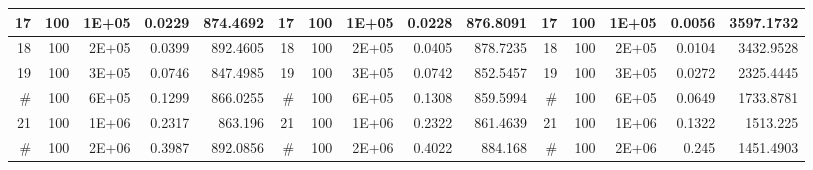 \begin{table}[htbp]
\begin{tabular}{|r|r|r|r|r|r|r|r|r|r|r|r|r|r|r|}
		\midrule
		17                                & 100                             & 1E+05                           & 0.0229                             & 874.4692                             & 17                               & 100                             & 1E+05                           & 0.0228                             & 876.8091                             & 17 & 100      & 1E+05 & 0.0056 & 3597.1732 \\
		\midrule
		18                                & 100                             & 2E+05                           & 0.0399                             & 892.4605                             & 18                               & 100                             & 2E+05                           & 0.0405                             & 878.7235                             & 18 & 100      & 2E+05 & 0.0104 & 3432.9528 \\
		\midrule
		19                                & 100                             & 3E+05                           & 0.0746                             & 847.4985                             & 19                               & 100                             & 3E+05                           & 0.0742                             & 852.5457                             & 19 & 100      & 3E+05 & 0.0272 & 2325.4445 \\
		\midrule
		\#                                & 100                             & 6E+05                           & 0.1299                             & 866.0255                             & \#                               & 100                             & 6E+05                           & 0.1308                             & 859.5994                             & \# & 100      & 6E+05 & 0.0649 & 1733.8781 \\
		\midrule
		21                                & 100                             & 1E+06                           & 0.2317                             & 863.196                              & 21                               & 100                             & 1E+06                           & 0.2322                             & 861.4639                             & 21 & 100      & 1E+06 & 0.1322 & 1513.225  \\
		\midrule
		\#                                & 100                             & 2E+06                           & 0.3987                             & 892.0856                             & \#                               & 100                             & 2E+06                           & 0.4022                             & 884.168                              & \# & 100      & 2E+06 & 0.245  & 1451.4903 \\

\end{tabular}
\end{table}
